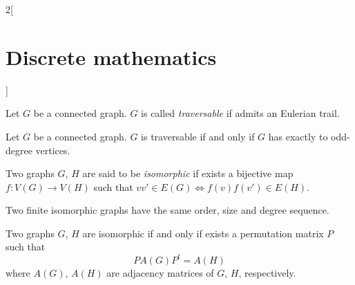 \documentclass[class=article,10pt,crop=false]{standalone}
\begin{document}
\begin{multicols}{2}[\section{Discrete mathematics}]
\begin{definition}
Let $G$ be a connected graph. $G$ is called \textit{traversable} if admits an Eulerian trail.
\end{definition}
\begin{theorem}
Let $G$ be a connected graph. $G$ is traversable if and only if $G$ has exactly to odd-degree vertices.
\end{theorem}
\begin{definition}
Two graphs $G$, $H$ are said to be \textit{isomorphic} if exists a bijective map $f:V(G)\rightarrow V(H)$ such that $vv'\in E(G)\iff f(v)f(v')\in E(H)$.
\end{definition}
\begin{prop}
Two finite isomorphic graphs have the same order, size and degree sequence.
\end{prop}
\begin{theorem}
Two graphs $G$, $H$ are isomorphic if and only if exists a permutation matrix $P$ such that $$PA(G)P^t=A(H)$$ where $A(G)$, $A(H)$ are adjacency matrices of $G$, $H$, respectively.
\end{theorem}

\end{multicols}
\end{document}
